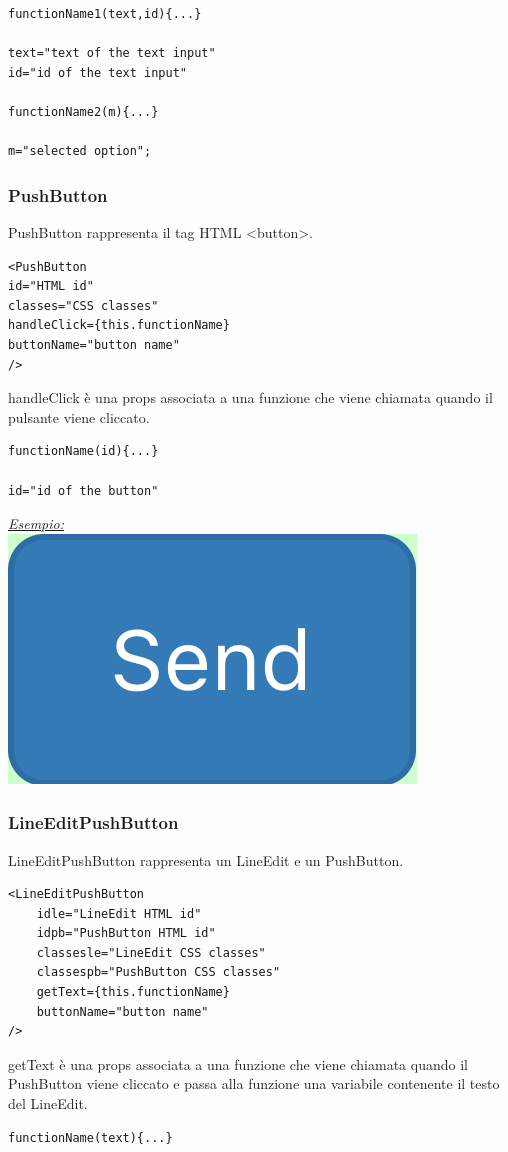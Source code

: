 \begin{flushleft}
\begin{verbatim}
functionName1(text,id){...}

text="text of the text input"
id="id of the text input"

functionName2(m){...}

m="selected option";
\end{verbatim}

\subsubsection{PushButton}
PushButton rappresenta il tag HTML <button>.
\begin{verbatim}
<PushButton
id="HTML id"
classes="CSS classes"
handleClick={this.functionName}
buttonName="button name"
/>
\end{verbatim}
handleClick è una props associata a una funzione che viene chiamata quando il pulsante viene cliccato.
\begin{verbatim}
functionName(id){...}

id="id of the button"
\end{verbatim}


\begin{center}
	\underline{\textit{Esempio:}}
	\\
	\includegraphics[scale=0.25]{img/pushB.png}
	\\
\end{center}

\subsubsection{LineEditPushButton}
LineEditPushButton rappresenta un LineEdit e un PushButton.
\begin{verbatim}
<LineEditPushButton
	idle="LineEdit HTML id"
	idpb="PushButton HTML id"
	classesle="LineEdit CSS classes"
	classespb="PushButton CSS classes"
	getText={this.functionName}
	buttonName="button name"
/>
\end{verbatim}
getText è una props associata a una funzione che viene chiamata quando il PushButton viene cliccato e passa alla funzione una variabile contenente il testo del LineEdit.
\begin{verbatim}
functionName(text){...}


\end{verbatim}
\end{flushleft}
